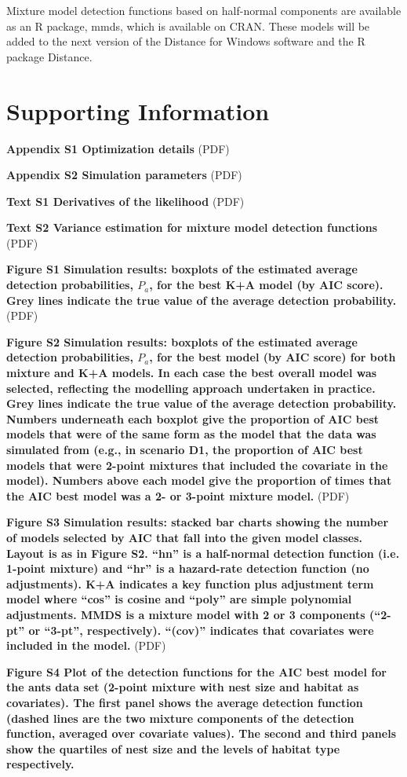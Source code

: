 \documentclass[10pt]{article}
\begin{document}
Mixture model detection functions based on half-normal components are available as an R package, mmds, which is available on CRAN. These models will be added to the next version of the Distance for Windows software and the R package Distance.

\section*{Supporting Information}

\textbf{Appendix S1 Optimization details} (PDF)

\textbf{Appendix S2 Simulation parameters} (PDF)

\textbf{Text S1 Derivatives of the likelihood} (PDF)

\textbf{Text S2 Variance estimation for mixture model detection functions} (PDF)

\textbf{Figure S1 Simulation results: boxplots of the estimated average detection probabilities, $P_a$, for the best K+A model (by AIC score). Grey lines indicate the true value of the average detection probability.} (PDF)

\textbf{Figure S2 Simulation results: boxplots of the estimated average detection probabilities, $P_a$, for the best model (by AIC score) for both mixture and K+A models. In each case the best overall model was selected, reflecting the modelling approach undertaken in practice. Grey lines indicate the true value of the average detection probability. Numbers underneath each boxplot give the proportion of AIC best models that were of the same form as the model that the data was simulated from (e.g., in scenario D1, the proportion of AIC best models that were 2-point mixtures that included the covariate in the model). Numbers above each model give the proportion of times that the AIC best model was a 2- or 3-point mixture model.} (PDF)

\textbf{Figure S3 Simulation results: stacked bar charts showing the number of models selected by AIC that fall into the given model classes. Layout is as in Figure S2. ``hn'' is a half-normal detection function (i.e. 1-point mixture) and ``hr'' is a hazard-rate detection function (no adjustments). K+A indicates a key function plus adjustment term model where ``cos'' is cosine and ``poly'' are simple polynomial adjustments. MMDS is a mixture model with 2 or 3 components (``2-pt'' or ``3-pt'', respectively). ``(cov)'' indicates that covariates were included in the model.} (PDF)

\textbf{Figure S4 Plot of the detection functions for the AIC best model for the ants data set (2-point mixture with nest size and habitat as covariates). The first panel shows the average detection function (dashed lines are the two mixture components of the detection function, averaged over covariate values). The second and third panels show the quartiles of nest size and the levels of habitat type respectively.}
\end{document}
